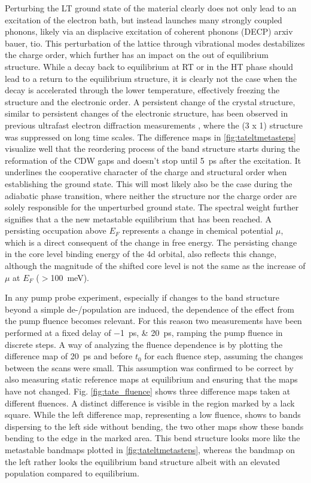 Perturbing the LT ground state of the material clearly does not only lead to an excitation of the electron bath, but instead launches many strongly coupled phonons, likely via an displacive excitation of coherent phonons (DECP) \cite{} arxiv bauer, tio.
This perturbation of the lattice through vibrational modes destabilizes the charge order, which further has an impact on the out of equilibrium structure.
While a decay back to equilibrium at RT or in the HT phase should lead to a return to the equilibrium structure, it is clearly not the case when the decay is accelerated through the lower temperature, effectively freezing the structure and the electronic order.
A persistent change of the crystal structure, similar to persistent changes of the electronic structure, has been observed in previous ultrafast electron diffraction measurements \cite{siddiqui_ultrafast_2021, domrose_femtosecond_2024}, where the (3 x 1) structure was suppressed on long time scales.
The difference maps in \ref{fig:tateltmetasteps} visualize well that the reordering process of the band structure starts during the reformation of the CDW gaps and doesn't stop until \qty{5}{\pico\second} after the excitation.
It underlines the cooperative character of the charge and structural order when establishing the ground state.
This will most likely also be the case during the adiabatic phase transition, where neither the structure nor the charge order are solely responsible for the unperturbed ground state.
The spectral weight further signifies that a the new metastable equilibrium that has been reached.
A persisting occupation above $E_F$ represents a change in chemical potential $\mu$, which is a direct consequent of the change in free energy.
The persisting change in the core level binding energy of the  4d orbital, also reflects this change, although the magnitude of the shifted core level is not the same as the increase of $\mu$ at $E_F$ ($>$\qty{100}{\milli\electronvolt}).

In any pump probe experiment, especially if changes to the band structure beyond a simple de-/population are induced, the dependence of the effect from the pump fluence becomes relevant.
For this reason two measurements have been performed at a fixed delay of \qtylist{-1; 20}{\pico\second}, ramping the pump fluence in discrete steps.
A way of analyzing the fluence dependence is by plotting the difference map of \qty{20}{\pico\second} and before $t_0$ for each fluence step, assuming the changes between the scans were small.
This assumption was confirmed to be correct by also measuring static reference maps at equilibrium and ensuring that the maps have not changed.
Fig. \ref{fig:tate_fluence} shows three difference maps taken at different fluences.
A distinct difference is visible in the region marked by a lack square.
While the left difference map, representing a low fluence, shows to bands dispersing to the left side without bending, the two other maps show these bands bending to the edge in the marked area.
This bend structure looks more like the metastable bandmaps plotted in \ref{fig:tateltmetasteps}, whereas the bandmap on the left rather looks the equilibrium band structure albeit with an elevated population compared to equilibrium.


